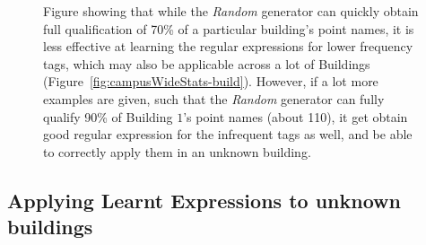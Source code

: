 \begin{figure}[ht!]
\caption{Figure showing that while the {\it Random} generator can quickly obtain full qualification of 70\% of a particular building's point names, it is less effective at learning the regular expressions for lower frequency tags, which may also be applicable across a lot of Buildings (Figure~\ref{fig:campusWideStats-build}). However, if a lot more examples are given, such that the {\it Random} generator can fully qualify 90\% of Building $1$'s point names (about 110), it get obtain good regular expression for the infrequent tags as well, and be able to correctly apply them in an unknown building.}
\label{fig:recallCampuswide}
\end{figure}


\subsection{Applying Learnt Expressions to unknown buildings}




%
%  





